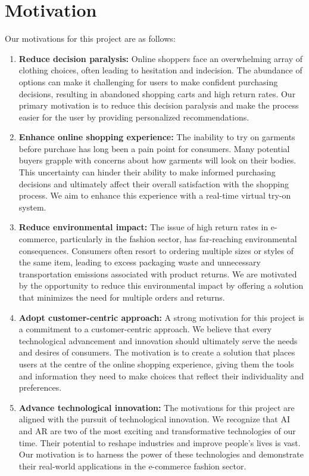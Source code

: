 \section{Motivation}
	Our motivations for this project are as follows:

	\begin{enumerate}
		\item \textbf{Reduce decision paralysis:} Online shoppers face an overwhelming array of clothing choices, often leading to hesitation and indecision. The abundance of options can make it challenging for users to make confident purchasing decisions, resulting in abandoned shopping carts and high return rates. Our primary motivation is to reduce this decision paralysis and make the process easier for the user by providing personalized recommendations.
		\item \textbf{Enhance online shopping experience:} The inability to try on garments before purchase has long been a pain point for consumers. Many potential buyers grapple with concerns about how garments will look on their bodies. This uncertainty can hinder their ability to make informed purchasing decisions and ultimately affect their overall satisfaction with the shopping process. We aim to enhance this experience with a real-time virtual try-on system.
		\item \textbf{Reduce environmental impact:} The issue of high return rates in e-commerce, particularly in the fashion sector, has far-reaching environmental consequences. Consumers often resort to ordering multiple sizes or styles of the same item, leading to excess packaging waste and unnecessary transportation emissions associated with product returns. We are motivated by the opportunity to reduce this environmental impact by offering a solution that minimizes the need for multiple orders and returns.
		\item \textbf{Adopt customer-centric approach:} A strong motivation for this project is a commitment to a customer-centric approach. We believe that every technological advancement and innovation should ultimately serve the needs and desires of consumers. The motivation is to create a solution that places users at the centre of the online shopping experience, giving them the tools and information they need to make choices that reflect their individuality and preferences.
		\item \textbf{Advance technological innovation:} The motivations for this project are aligned with the pursuit of technological innovation. We recognize that AI and AR are two of the most exciting and transformative technologies of our time. Their potential to reshape industries and improve people's lives is vast. Our motivation is to harness the power of these technologies and demonstrate their real-world applications in the e-commerce fashion sector.
	\end{enumerate}
